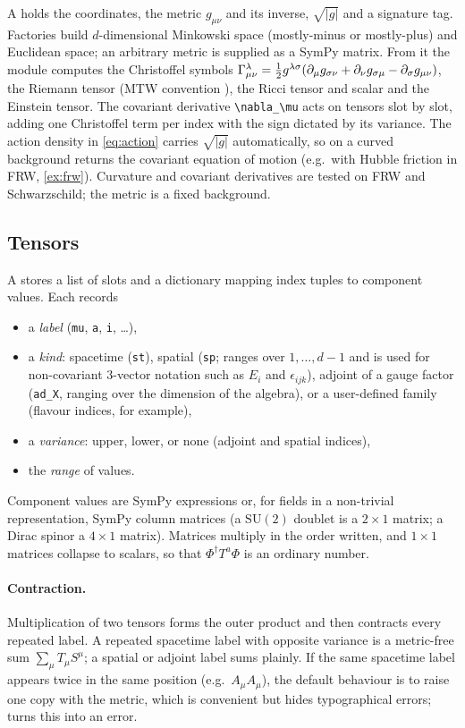 A  holds the coordinates, the metric $g_{\mu\nu}$ and its inverse, $\sqrt{|g|}$ and a signature tag. Factories build $d$-dimensional Minkowski space (mostly-minus or mostly-plus) and Euclidean space; an arbitrary metric is supplied as a SymPy matrix. From it the module computes the Christoffel symbols $\Gamma^\lambda_{\mu\nu}=\tfrac12g^{\lambda\sigma}(\partial_\mu g_{\sigma\nu}+\partial_\nu g_{\sigma\mu}-\partial_\sigma g_{\mu\nu})$, the Riemann tensor (MTW convention \cite{MTW}), the Ricci tensor and scalar and the Einstein tensor. The covariant derivative \verb|\nabla_\mu| acts on tensors slot by slot, adding one Christoffel term per index with the sign dictated by its variance. The action density in \cref{eq:action} carries $\sqrt{|g|}$ automatically, so  on a curved background returns the covariant equation of motion (e.g.\ with Hubble friction in FRW, \cref{ex:frw}). Curvature and covariant derivatives are tested on FRW and Schwarzschild; the metric is a fixed background.

\subsection{Tensors}
\label{sec:tensors}

A  stores a list of slots and a dictionary mapping index tuples to component values. Each  records
\begin{itemize}[nosep]
\item a \emph{label} (\texttt{mu}, \texttt{a}, \texttt{i}, \dots),
\item a \emph{kind}: spacetime (\texttt{st}), spatial (\texttt{sp}; ranges over $1,\dots,d-1$ and is used for non-covariant 3-vector notation such as $E_i$ and $\epsilon_{ijk}$), adjoint of a gauge factor (\texttt{ad\_X}, ranging over the dimension of the algebra), or a user-defined family (flavour indices, for example),
\item a \emph{variance}: upper, lower, or none (adjoint and spatial indices),
\item the \emph{range} of values.
\end{itemize}
Component values are SymPy expressions or, for fields in a non-trivial representation, SymPy column matrices (a $\mathrm{SU}(2)$ doublet is a $2\times1$ matrix; a Dirac spinor a $4\times1$ matrix). Matrices multiply in the order written, and $1\times1$ matrices collapse to scalars, so that $\Phi^\dagger T^a\Phi$ is an ordinary number.

\paragraph{Contraction.} Multiplication of two tensors forms the outer product and then contracts every repeated label. A repeated spacetime label with opposite variance is a metric-free sum $\sum_\mu T_\mu S^\mu$; a spatial or adjoint label sums plainly. If the same spacetime label appears twice in the same position (e.g.\ $A_\mu A_\mu$), the default behaviour is to raise one copy with the metric, which is convenient but hides typographical errors;  turns this into an error.


